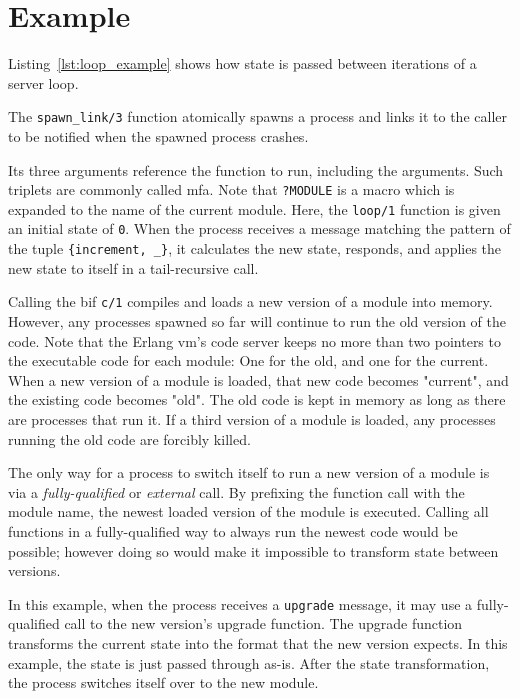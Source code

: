 \section{Example}



Listing~\ref{lst:loop_example} shows how state is passed between iterations of a server loop.

The \lstinline{spawn_link/3} function atomically spawns a process and links it to the caller to be notified when the spawned process crashes.

Its three arguments reference the function to run, including the arguments. Such triplets are commonly called \acrfull{mfa}. Note that \lstinline|?MODULE| is a macro which is expanded to the name of the current module. Here, the \lstinline{loop/1} function is given an initial state of \lstinline{0}. When the process receives a message matching the pattern of the tuple \lstinline|{increment, _}|, it calculates the new state, responds, and applies the new state to itself in a tail-recursive call.

Calling the \acrfull{bif} \lstinline|c/1| compiles and loads a new version of a module into memory. However, any processes spawned so far will continue to run the old version of the code. Note that the Erlang \acrshort{vm}'s code server keeps no more than two pointers to the executable code for each module: One for the old, and one for the current. When a new version of a module is loaded, that new code becomes "current", and the existing code becomes "old". The old code is kept in memory as long as there are processes that run it. If a third version of a module is loaded, any processes running the old code are forcibly killed.

The only way for a process to switch itself to run a new version of a module is via a \emph{fully-qualified} or \emph{external} call. By prefixing the function call with the module name, the newest loaded version of the module is executed. Calling all functions in a fully-qualified way to always run the newest code would be possible; however doing so would make it impossible to transform state between versions.

In this example, when the process receives a \lstinline{upgrade} message, it may use a fully-qualified call to the new version's upgrade function. The upgrade function transforms the current state into the format that the new version expects. In this example, the state is just passed through as-is. After the state transformation, the process switches itself over to the new module.
